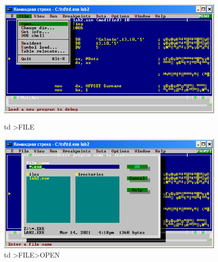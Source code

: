 \begin{figure}[!htp]
    \centering
    \begin{minipage}{0.48\textwidth}
        \centering
        \includegraphics[width=.98\linewidth]
            {../_INCLUDES/task-4-6-1/td-file.png}
        \caption{td >FILE}
    \end{minipage}
    \begin {minipage}{0.48\textwidth}
        \centering
        \includegraphics[width=.98\linewidth]
            {../_INCLUDES/task-4-6-1/td-file-open.png}
        \caption{td >FILE>OPEN}
    \end{minipage}
\end{figure}
